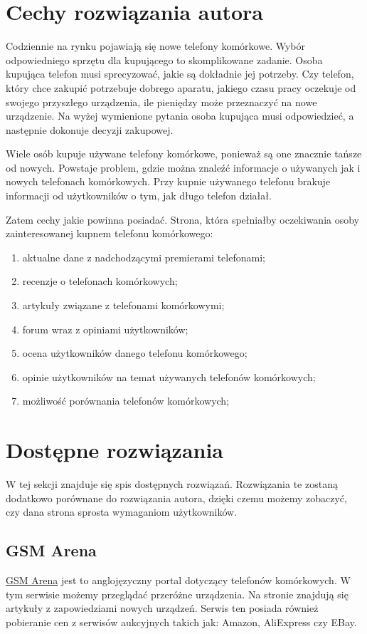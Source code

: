 \section{Cechy rozwiązania autora}\label{ideal_solution}
Codziennie na rynku pojawiają się nowe telefony komórkowe. Wybór odpowiedniego sprzętu dla kupującego to skomplikowane zadanie. Osoba kupująca telefon musi sprecyzować, jakie są dokładnie jej potrzeby. Czy telefon, który chce zakupić potrzebuje dobrego aparatu, jakiego czasu pracy oczekuje od swojego przyszłego urządzenia, ile pieniędzy może przeznaczyć na nowe urządzenie. Na wyżej wymienione pytania osoba kupująca musi odpowiedzieć, a następnie dokonuje decyzji zakupowej.

Wiele osób kupuje używane telefony komórkowe, ponieważ są one znacznie tańsze od nowych. Powstaje problem, gdzie można znaleźć informacje o używanych jak i nowych telefonach komórkowych. Przy kupnie używanego telefonu brakuje informacji od użytkowników o tym, jak długo telefon działał.  

Zatem cechy jakie powinna posiadać. Strona, która spełniałby oczekiwania osoby zainteresowanej kupnem telefonu komórkowego:
\begin{enumerate}
    \item aktualne dane z nadchodzącymi premierami telefonami;
    \item recenzje o telefonach komórkowych;
    \item artykuły związane z telefonami komórkowymi;
    \item forum wraz z opiniami użytkowników;
    \item ocena użytkowników danego telefonu komórkowego;
    \item opinie użytkowników na temat używanych telefonów komórkowych;
    \item możliwość porównania telefonów komórkowych;
\end{enumerate}

\section{Dostępne rozwiązania}
W tej sekcji znajduje się spis dostępnych rozwiązań. Rozwiązania te zostaną dodatkowo porównane do rozwiązania autora, dzięki czemu możemy zobaczyć, czy dana strona sprosta wymaganiom użytkowników.

\subsection{GSM Arena}
\href{https://www.gsmarena.com/}{GSM Arena} \cite{gsm_arena} jest to anglojęzyczny portal dotyczący telefonów komórkowych. W tym serwisie możemy przeglądać przeróżne urządzenia. Na stronie znajdują się artykuły z zapowiedziami nowych urządzeń. Serwis ten posiada również pobieranie cen z serwisów aukcyjnych takich jak: Amazon, AliExpress czy EBay.

